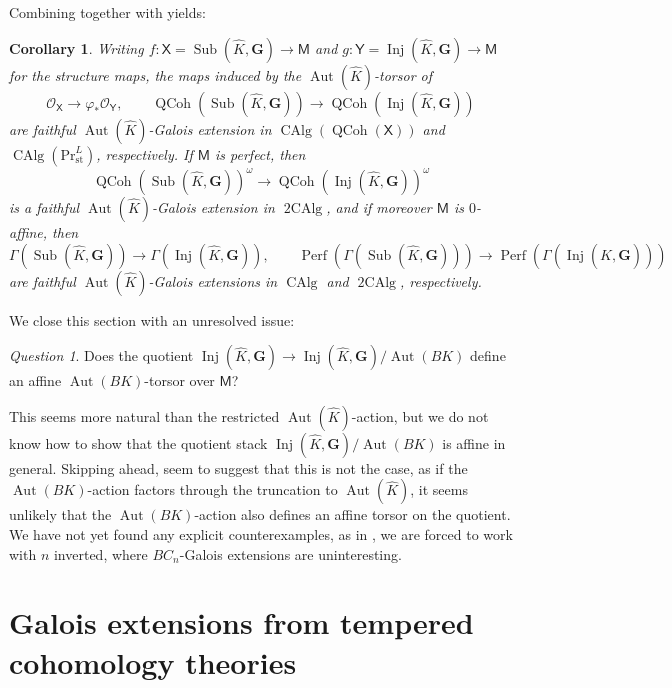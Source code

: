 \documentclass[11pt, a4paper]{article}
\newcommand{\st}{\mathrm{st}}
\newcommand{\1}{\mathbf{1}}
\DeclareMathOperator{\CAlg}{CAlg}
\DeclareMathOperator{\tworing}{2CAlg}
\newcommand{\PrLst}{{\mathrm{Pr}^L_\st}}
\DeclareMathOperator{\Inj}{Inj}
\DeclareMathOperator{\Sub}{Sub}
\DeclareMathOperator{\Perf}{Perf}
\DeclareMathOperator{\QCoh}{QCoh}
\DeclareMathOperator{\Aut}{Aut}
\newcommand{\dual}[1]{{\widehat{#1}}}
\newcommand{\G}{\mathbf{G}}
\newcommand{\M}{\mathsf{M}}
\renewcommand{\O}{\mathcal{O}}
\newcommand{\X}{\mathsf{X}}
\newcommand{\Y}{\mathsf{Y}}
\newcommand{\Ga}{\Gamma}
\theoremstyle{plain}
\newtheorem{cor}[equation]{Corollary}
\theoremstyle{definition}
\theoremstyle{remark}\numberwithin{equation}{section}
\newtheorem{question}[equation]{Question}
\begin{document}
Combining  together with  yields:

\begin{cor}\label{cor:galois_from_torsor}
    Writing $f\colon \X = \Sub(\dual{K},\G) \to \M$ and $g\colon \Y = \Inj(\dual{K}, \G) \to \M$ for the structure maps, the maps induced by the $\Aut(\dual{K})$-torsor of 
    \[\O_\X \to \varphi_\ast \O_\Y, \qquad \QCoh(\Sub(\dual{K},\G)) \to \QCoh(\Inj(\dual{K}, \G))\]
    are faithful $\Aut(\dual{K})$-Galois extension in $\CAlg(\QCoh(\X))$ and $\CAlg(\PrLst)$, respectively. If $\M$ is perfect, then
    \[\QCoh(\Sub(\dual{K},\G))^\omega \to \QCoh(\Inj(\dual{K}, \G))^\omega\]
    is a faithful $\Aut(\dual{K})$-Galois extension in $\tworing$, and if moreover $\M$ is $0$-affine, then
    \[\Ga(\Sub(\dual{K},\G)) \to \Ga(\Inj(\dual{K}, \G)), \qquad\Perf(\Ga(\Sub(\dual{K},\G))) \to \Perf(\Ga(\Inj(\dual{K}, \G)))\]
    are faithful $\Aut(\dual{K})$-Galois extensions in $\CAlg$ and $\tworing$, respectively.
\end{cor}

We close this section with an unresolved issue:

\begin{question}
    Does the quotient $\Inj(\dual{K}, \G) \to \Inj(\dual{K}, \G) / \Aut(BK)$ define an {affine} $\Aut(BK)$-torsor over $\M$?
\end{question}

This seems more natural than the restricted $\Aut(\dual{K})$-action, but we do not know how to show that the quotient stack $\Inj(\dual{K}, \G) / \Aut(BK)$ is affine in general. Skipping ahead,  seem to suggest that this is not the case, as if the $\Aut(BK)$-action factors through the truncation to $\Aut(\dual{K})$, it seems unlikely that the $\Aut(BK)$-action also defines an affine torsor on the quotient. We have not yet found any explicit counterexamples, as in , we are forced to work with $n$ inverted, where $BC_n$-Galois extensions are uninteresting.

\section{Galois extensions from tempered cohomology theories}\label{sec:ESHT_over_a_stack}
\end{document}
